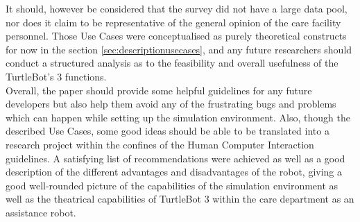 \documentclass[plainarticle,zihtitle,english,final,hyperref,utf8]{zihpub}
\begin{document}
 \newline
 It should, however be considered that the survey did not have a large data pool, nor does it claim to be representative of the general opinion of the care facility personnel. Those Use Cases were conceptualised as purely theoretical constructs for now in the section \ref{sec:descriptionusecases}, and any future researchers should conduct a structured analysis as to the feasibility and overall usefulness of the TurtleBot’s 3 functions.\\
 \newline
 Overall, the paper should provide some helpful guidelines for any future developers but also help them avoid any of the frustrating bugs and problems which can happen while setting up the simulation environment. Also, though the described Use Cases, some good ideas should be able to be translated into a research project within the confines of the Human Computer Interaction guidelines. A satisfying list of recommendations were achieved as well as a good description of the different advantages and disadvantages of the robot, giving a good well-rounded picture of the capabilities of the simulation environment as well as the theatrical capabilities of TurtleBot 3 within the care department as an assistance robot.
 \newpage
\end{document}
